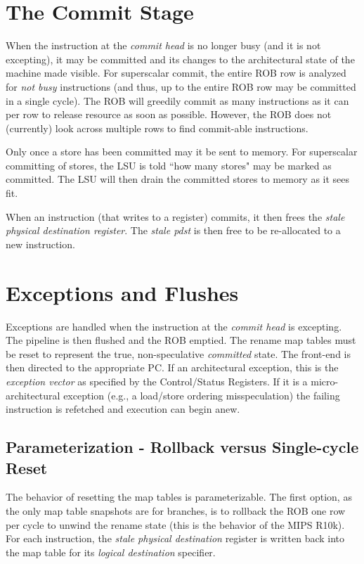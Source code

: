 \section{The Commit Stage}

When the instruction at the {\em commit head} is no longer busy (and it is not excepting), it may be committed and its changes to the architectural state of the machine made visible. For superscalar commit, the entire ROB row is analyzed for {\em not busy} instructions (and thus, up to the entire ROB row may be committed in a single cycle). The ROB will greedily commit as many instructions as it can per row to release resource as soon as possible. However, the ROB does not (currently) look across multiple rows to find commit-able instructions. 

Only once a store has been committed may it be sent to memory. For superscalar committing of stores, the LSU is told ``how many stores" may be marked as committed. The LSU will then drain the committed stores to memory as it sees fit. 

When an instruction (that writes to a register) commits, it then frees the {\em stale physical destination register}. The {\em stale pdst} is then free to be re-allocated to a new instruction. 


\section{Exceptions and Flushes}

Exceptions are handled when the instruction at the {\em commit head} is excepting. The pipeline is then flushed and the ROB emptied. The rename map tables must be reset to represent the true, non-speculative {\em committed} state. The front-end is then directed to the appropriate PC.  If an architectural exception, this is the {\em exception vector} as specified by the Control/Status Registers.  If it is a micro-architectural exception (e.g., a load/store ordering misspeculation) the failing instruction is refetched and execution can begin anew. 

\subsection{Parameterization - Rollback versus Single-cycle Reset}

The behavior of resetting the map tables is parameterizable.  The first option, as the only map table snapshots are for branches, is to rollback the ROB one row per cycle to unwind the rename state (this is the behavior of the MIPS R10k\cite{mipsr10k}).  For each instruction, the {\em stale physical destination} register is written back into the map table for its {\em logical destination} specifier. 

